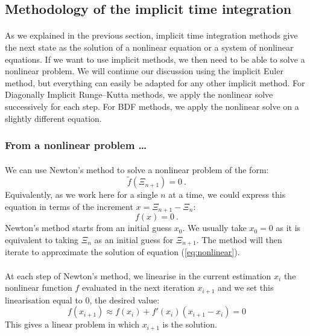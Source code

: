     \subsection{Methodology of the implicit time integration}

      \paragraph{}
      As we explained in the previous section, implicit time integration methods give the next state as the solution of a nonlinear equation or a system of nonlinear equations.
      If we want to use implicit methods, we then need to be able to solve a nonlinear problem.
      We will continue our discussion using the implicit Euler method, but everything can easily be adapted for any other implicit method.
      For Diagonally Implicit Runge--Kutta methods, we apply the nonlinear solve successively for each step.
      For BDF methods, we apply the nonlinear solve on a slightly different equation.


      \subsubsection{From a nonlinear problem \dots}

      	\paragraph{}
      	We can use Newton's method to solve a nonlinear problem of the form:
      	\begin{equation}
      		\tilde{f}\left(\Xi_{n+1}\right) = 0 \ .
      	\end{equation}
        Equivalently, as we work here for a single $n$ at a time, we could express this equation in terms of the increment $x = \Xi_{n+1} - \Xi_n$:
        \begin{equation}\label{eq:nonlinear}
      		f\left(x\right) = 0 \ .
      	\end{equation}
        Newton's method starts from an initial guess $x_0$.
        We usually take $x_0 = 0$ as it is equivalent to taking $\Xi_n$ as an initial guess for $\Xi_{n+1}$.
        The method will then iterate to approximate the solution of equation (\ref{eq:nonlinear}).

        \paragraph{}
        At each step of Newton's method, we linearise  in the current estimation $x_i$ the nonlinear function $f$ evaluated  in the next iteration $x_{i+1}$ and we set this linearisation equal to 0, the desired value:
        \begin{equation}\label{eq:nonlinear_linearised}
          f\left(x_{i+1}\right) \approx f\left(x_i\right) + f'\left(x_i\right) \left( x_{i+1} - x_i \right) = 0
        \end{equation}
        This gives a linear problem in which $x_{i+1}$ is the solution.


